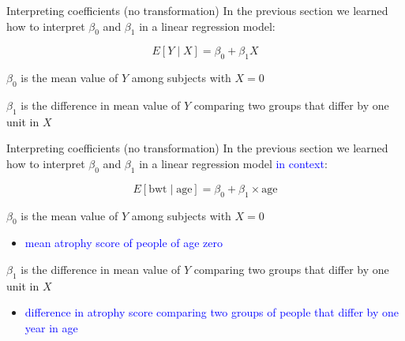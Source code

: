 \documentclass[10pt,t]{beamer}
\begin{document}
\begin{frame}{Interpreting coefficients (no transformation)}
In the previous section we learned how to interpret $\beta_0$ and $\beta_1$ in a linear regression model:

$$
E[Y \mid X] = \beta_0 + \beta_1 X
$$

\vspace{0.2cm}

$\beta_0$ is the mean value of $Y$ among subjects with $X = 0$

\vspace{0.3cm}

$\beta_1$ is the difference in mean value of $Y$ comparing two groups that differ by one unit in $X$


\end{frame}

\begin{frame}{Interpreting coefficients (no transformation)}
In the previous section we learned how to interpret $\beta_0$ and $\beta_1$ in a linear regression model \textcolor{blue}{in context}:

$$
E[\text{bwt} \mid \text{age}] = \beta_0 + \beta_1 \times \text{age}
$$

\vspace{0.2cm}

$\beta_0$ is the mean value of $Y$ among subjects with $X = 0$

\begin{itemize}
	\item[] \textcolor{blue}{mean atrophy score of people of age zero}
\end{itemize}


\vspace{0.3cm}

$\beta_1$ is the difference in mean value of $Y$ comparing two groups that differ by one unit in $X$

\begin{itemize}
	\item[] \textcolor{blue}{difference in atrophy score comparing two groups of people that differ by one year in age}
\end{itemize} 

\end{frame}
\end{document}
